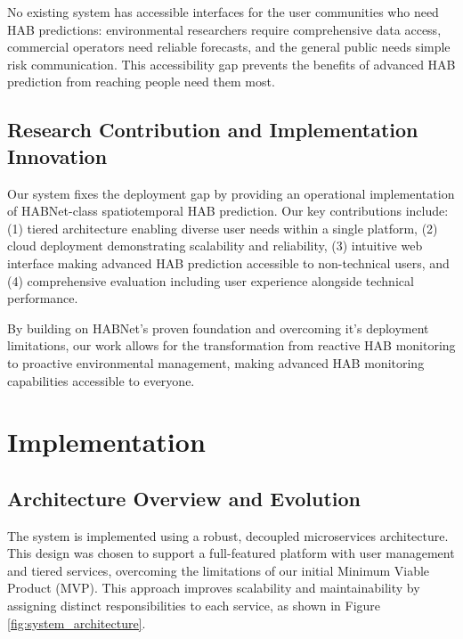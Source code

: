 \documentclass[conference]{IEEEtran}
\begin{document}
No existing system has accessible interfaces for the user communities who need HAB predictions: environmental researchers require comprehensive data access, commercial operators need reliable forecasts, and the general public needs simple risk communication. This accessibility gap prevents the benefits of advanced HAB prediction from reaching people need them most.

\subsection{Research Contribution and Implementation Innovation}

Our system fixes the deployment gap by providing an operational implementation of HABNet-class spatiotemporal HAB prediction. Our key contributions include: 
(1) tiered architecture enabling diverse user needs within a single platform, (2) cloud deployment demonstrating scalability and reliability, (3) intuitive web interface making advanced HAB prediction accessible to non-technical users, and (4) comprehensive evaluation including user experience alongside technical performance.

By building on HABNet's proven foundation and overcoming it's deployment limitations, our work allows for the transformation from reactive HAB monitoring to proactive environmental management, making advanced HAB monitoring capabilities accessible to everyone.
\section{Implementation}

\subsection{Architecture Overview and Evolution}

The system is implemented using a robust, decoupled microservices architecture. This design was chosen to support a full-featured platform with user management and tiered services, overcoming the limitations of our initial Minimum Viable Product (MVP). This approach improves scalability and maintainability by assigning distinct responsibilities to each service, as shown in Figure \ref{fig:system_architecture}.
\end{document}
